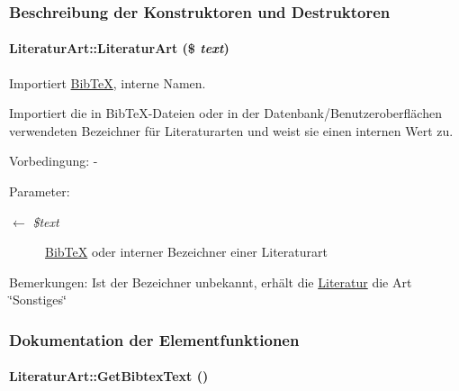 \subsubsection{Beschreibung der Konstruktoren und Destruktoren}
\hypertarget{classLiteraturArt_b3312217430531ed7821a46a39c49af7}{
\paragraph[LiteraturArt]{\setlength{\rightskip}{0pt plus 5cm}Literatur\-Art::Literatur\-Art (\$ {\em text})}\hfill}
\label{classLiteraturArt_b3312217430531ed7821a46a39c49af7}


Importiert \hyperlink{classBibTeX}{Bib\-Te\-X}, interne Namen. 

Importiert die in Bib\-Te\-X-Dateien oder in der Datenbank/Benutzeroberflächen verwendeten Bezeichner für Literaturarten und weist sie einen internen Wert zu. \begin{Desc}
\item[Vorbedingung:]- \end{Desc}
\begin{Desc}
\item[Parameter:]
\begin{description}
\item[\mbox{$\leftarrow$} {\em \$text}]\hyperlink{classBibTeX}{Bib\-Te\-X} oder interner Bezeichner einer Literaturart \end{description}
\end{Desc}
\begin{Desc}
\item[Bemerkungen:]Ist der Bezeichner unbekannt, erhält die \hyperlink{classLiteratur}{Literatur} die Art \char`\"{}Sonstiges\char`\"{} \end{Desc}


\subsubsection{Dokumentation der Elementfunktionen}
\hypertarget{classLiteraturArt_01e1a2acd95df1ae0bb22e57b70a63de}{
\paragraph[GetBibtexText]{\setlength{\rightskip}{0pt plus 5cm}Literatur\-Art::Get\-Bibtex\-Text ()}\hfill}
\label{classLiteraturArt_01e1a2acd95df1ae0bb22e57b70a63de}


